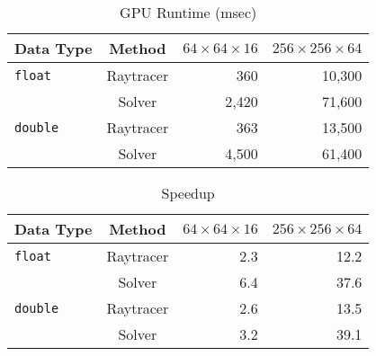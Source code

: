 \begin{table}[ht]
\caption{GPU Runtime (msec)}
\centering 
\begin{tabular}{l c r r}
\hline \hline   
Data Type & Method & $64 \times 64 \times 16$ & $256 \times 256 \times 64$\\ [0.5ex] 
\hline
\texttt{float}  & Raytracer & 360   &  10,300 \\
                & Solver    & 2,420  &  71,600 \\
\texttt{double} & Raytracer & 363   & 13,500 \\
                & Solver    & 4,500   & 61,400 \\  [1ex]
\hline
\end{tabular}
\label{tab:gpu}
\end{table}

\begin{table}[ht]
\caption{Speedup}
\centering 
\begin{tabular}{l c r r}
\hline \hline   
Data Type & Method & $64 \times 64 \times 16$ & $256 \times 256 \times 64$\\ [0.5ex] 
\hline
\texttt{float}  & Raytracer & 2.3   & 12.2 \\
                & Solver    & 6.4  &  37.6 \\
\texttt{double} & Raytracer & 2.6   & 13.5 \\
                & Solver    & 3.2   & 39.1 \\  [1ex]
\hline
\end{tabular}
\label{tab:speedup}
\end{table}

\endinput
